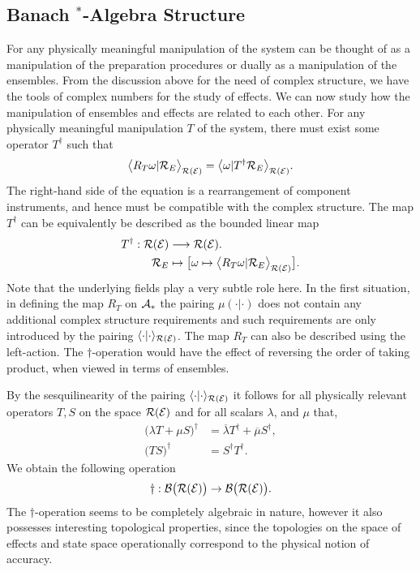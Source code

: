 \documentclass[11pt]{article}
\begin{document}
\subsection*{Banach $^*$-Algebra Structure}
For any physically meaningful manipulation of the system can be thought of as a manipulation of the preparation procedures or dually as a manipulation of the ensembles. From the discussion above for the need of complex structure, we have the tools of complex numbers for the study of effects. We can now study how the manipulation of ensembles and effects are related to each other. For any physically meaningful manipulation $T$ of the system, there must exist some operator $T^\dagger$ such that
$$\big\langle R_T\omega|\mathcal{R}_E\big\rangle_{\mathcal{R}(\mathcal{E})}=\big\langle \omega|T^\dagger \mathcal{R}_E\big\rangle_{\mathcal{R}(\mathcal{E})}.$$
The right-hand side of the equation is a rearrangement of component instruments, and hence must be compatible with the complex structure. The map $T^\dagger$ can be equivalently be described as the bounded linear map
\begin{align*}
	T^\dagger:\mathcal{R}(\mathcal{E})&\longrightarrow \mathcal{R}(\mathcal{E}).\\
				\mathcal{R}_E&\mapsto \big[\omega\mapsto \big\langle R_T\omega|\mathcal{R}_E\big\rangle_{\mathcal{R}(\mathcal{E})}\big].
\end{align*}
Note that the underlying fields play a very subtle role here. In the first situation, in defining the map $R_T$ on $\mathcal{A}_*$ the pairing $\mu(\cdot|\cdot)$ does not contain any additional complex structure requirements and such requirements are only introduced by the pairing $\langle \cdot|\cdot\rangle_{\mathcal{R}(\mathcal{E})}$. The map $R_T$ can also be described using the left-action. The $\dagger$-operation would have the effect of reversing the order of taking product, when viewed in terms of ensembles.

By the sesquilinearity of the pairing $\langle \cdot|\cdot\rangle_{\mathcal{R}(\mathcal{E})}$ it follows for all physically relevant operators $T,S$ on the space $\mathcal{R}(\mathcal{E})$ and for all scalars $\lambda$, and $\mu$ that,
\begin{align*}
	\big({\lambda T+\mu S}\big)^\dagger &=\overline{\lambda} T^\dagger +\overline{\mu} S^\dagger , \\
	\big(TS\big)^\dagger&=S^\dagger T^\dagger.
\end{align*}
We obtain the following operation
\[\dagger:\mathcal{B}\big(\mathcal{R}(\mathcal{E})\big)\to \mathcal{B}\big(\mathcal{R}(\mathcal{E})\big).\]
The $\dagger$-operation seems to be completely algebraic in nature, however it also  possesses interesting topological properties, since the topologies on the space of effects and state space operationally correspond to the physical notion of accuracy.
\end{document}
